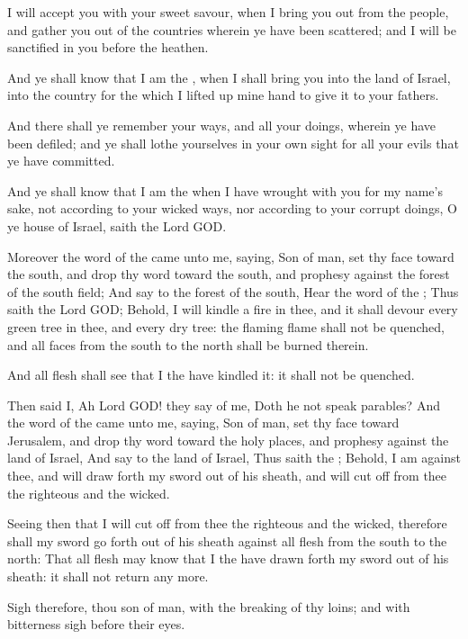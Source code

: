 \Verse I will accept you with your sweet savour, when I bring you out from the people, and gather you out of the countries wherein ye have been scattered; and I will be sanctified in you before the heathen.

\Verse And ye shall know that I am the \LORD, when I shall bring you into the land of Israel, into the country for the which I lifted up mine hand to give it to your fathers.

\Verse And there shall ye remember your ways, and all your doings, wherein ye have been defiled; and ye shall lothe yourselves in your own sight for all your evils that ye have committed.

\Verse And ye shall know that I am the \LORD when I have wrought with you for my name's sake, not according to your wicked ways, nor according to your corrupt doings, O ye house of Israel, saith the Lord GOD.

\Verse Moreover the word of the \LORD came unto me, saying, \Verse Son of man, set thy face toward the south, and drop thy word toward the south, and prophesy against the forest of the south field; \Verse And say to the forest of the south, Hear the word of the \LORD; Thus saith the Lord GOD; Behold, I will kindle a fire in thee, and it shall devour every green tree in thee, and every dry tree: the flaming flame shall not be quenched, and all faces from the south to the north shall be burned therein.

\Verse And all flesh shall see that I the \LORD have kindled it: it shall not be quenched.

\Verse Then said I, Ah Lord GOD! they say of me, Doth he not speak parables?  
\Chapter
\Verse And the word of the \LORD came unto me, saying, \Verse Son of man, set thy face toward Jerusalem, and drop thy word toward the holy places, and prophesy against the land of Israel, \Verse And say to the land of Israel, Thus saith the \LORD; Behold, I am against thee, and will draw forth my sword out of his sheath, and will cut off from thee the righteous and the wicked.

\Verse Seeing then that I will cut off from thee the righteous and the wicked, therefore shall my sword go forth out of his sheath against all flesh from the south to the north: \Verse That all flesh may know that I the \LORD have drawn forth my sword out of his sheath: it shall not return any more.

\Verse Sigh therefore, thou son of man, with the breaking of thy loins; and with bitterness sigh before their eyes.

